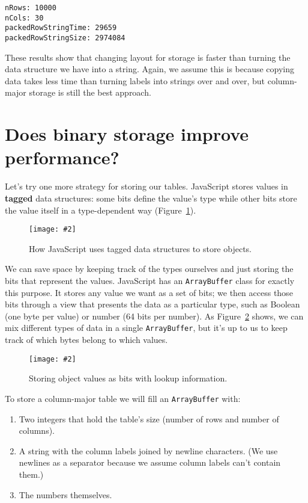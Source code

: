 \documentclass[krantzl]{krantz}
\newcommand{\figpdf}[4]{\begin{figure}%
\centering%
\texttt{[image: \#2]}%
\caption{#3}%
\label{#1}%
\end{figure}}
\newcommand{\figref}[1]{Figure~\ref{#1}}
\newcommand{\glossref}[1]{\textbf{#1}}
\begin{document}
\begin{lstlisting}[frame=single,frameround=tttt]
nRows: 10000
nCols: 30
packedRowStringTime: 29659
packedRowStringSize: 2974084
\end{lstlisting}



These results show that changing layout for storage
is faster than turning the data structure we have into a string.
Again,
we assume this is because copying data takes less time than turning labels into strings over and over,
but column-major storage is still the best approach.

\section{Does binary storage improve performance?}\label{data-table-binary}


Let's try one more strategy for storing our tables.
JavaScript stores values in \glossref{tagged} data structures:
some bits define the value's type
while other bits store the value itself in a type-dependent way
(\figref{data-table-object-storage}).

\figpdf{data-table-object-storage}{./data-table/object-storage.pdf}{How JavaScript uses tagged data structures to store objects.}{0.6}


We can save space by keeping track of the types ourselves
and just storing the bits that represent the values.
JavaScript has an \texttt{ArrayBuffer} class for exactly this purpose.
It stores any value we want as a set of bits;
we then access those bits through a view that presents the data as a particular type,
such as Boolean (one byte per value) or number (64 bits per number).
As \figref{data-table-packed-storage} shows,
we can mix different types of data in a single \texttt{ArrayBuffer},
but it's up to us to keep track of which bytes belong to which values.

\figpdf{data-table-packed-storage}{./data-table/packed-storage.pdf}{Storing object values as bits with lookup information.}{0.6}


To store a column-major table we will fill an \texttt{ArrayBuffer} with:

\begin{enumerate}

\item 

Two integers that hold the table's size (number of rows and number of columns).



\item 

A string with the column labels joined by newline characters.
    (We use newlines as a separator because we assume column labels can't contain them.)



\item 

The numbers themselves.



\end{enumerate}
\end{document}
